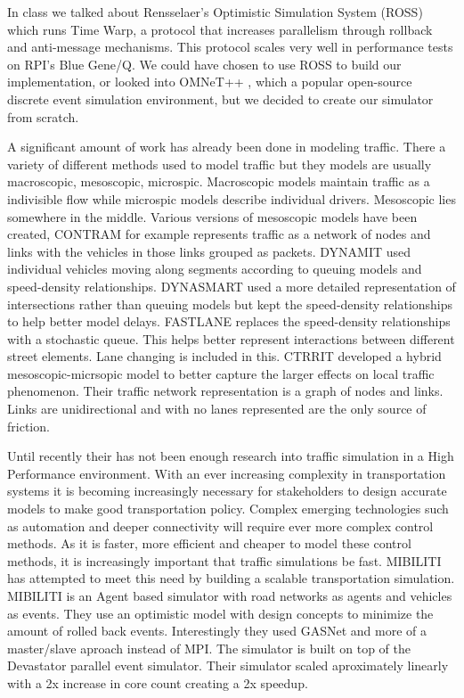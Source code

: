 \documentclass[10pt,a4paper]{article}
\begin{document}
In class we talked about Rensselaer’s Optimistic Simulation System (ROSS) \cite{Barnes:2013:WSE:2486092.2486134} which runs Time Warp, a protocol that increases parallelism through rollback and anti-message mechanisms. This protocol scales very well in performance tests on RPI's Blue Gene/Q. We could have chosen to use ROSS to build our implementation, or looked into OMNeT++ \cite{Varga:2008:OOS:1416222.1416290}, which a popular open-source discrete event simulation environment, but we decided to create our simulator from scratch. 

A significant amount of work has already been done in modeling traffic. There a variety of different methods used to model traffic but they models are usually macroscopic, mesoscopic, microspic. Macroscopic models maintain traffic as a indivisible flow while microspic models describe individual drivers. Mesoscopic lies somewhere in the middle. Various versions of mesoscopic models have been created, CONTRAM \cite{CONTRAM:1989} for example represents traffic as a network of nodes and links with the vehicles in those links grouped as packets. DYNAMIT \cite{Ben-AKiva:2001} used individual vehicles moving along segments according to queuing models and speed-density relationships. DYNASMART \cite{Jayakrishnan:1994} used a more detailed representation of intersections rather than queuing models but kept the speed-density relationships to help better model delays. FASTLANE \cite{Gawron:1998} replaces the speed-density relationships with a stochastic queue. This helps better represent interactions between different street elements. Lane changing is included in this. CTRRIT \cite{Burghout:2006} developed a hybrid mesoscopic-micrsopic model to better capture the larger effects on local traffic phenomenon. Their traffic network representation is a graph of nodes and links. Links are unidirectional and with no lanes represented are the only source of friction.

Until recently their has not been enough research into traffic simulation in a High Performance environment. With an ever increasing complexity in transportation systems it is becoming increasingly necessary for stakeholders to design accurate models to make good transportation policy. Complex emerging technologies such as automation and deeper connectivity will require ever more complex control methods. As it is faster, more efficient and cheaper to model these control methods, it is increasingly important that traffic simulations be fast. MIBILITI \cite{MOBILIT:2018} has attempted to meet this need by building a scalable transportation simulation. MIBILITI is an Agent based simulator with road networks as agents and vehicles as events. They use an optimistic model with design concepts to minimize the amount of rolled back events. Interestingly they used GASNet and more of a master/slave aproach instead of MPI. The simulator is built on top of the Devastator parallel event simulator. Their simulator scaled aproximately linearly with a 2x increase in core count creating a 2x speedup.
\end{document}
